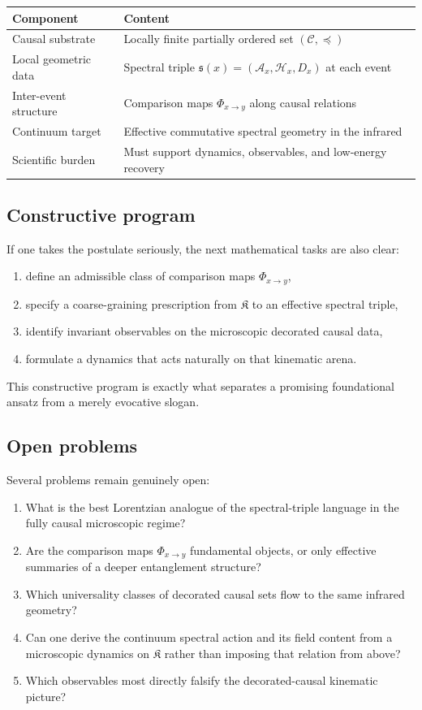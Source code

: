 \documentclass[12pt,a4paper]{article}
\theoremstyle{postulate}
\newcommand{\Hil}{\mathcal{H}}
\newcommand{\Alg}{\mathcal{A}}
\newcommand{\Dirac}{D}
\newcommand{\Causal}{\mathcal{C}}
\newcommand{\Kset}{\mathfrak{K}}
\begin{document}
\begin{center}
\renewcommand{\arraystretch}{1.2}
\begin{tabular}{@{}p{3.0cm}p{10.0cm}@{}}
\toprule
\textbf{Component} & \textbf{Content} \\
\midrule
Causal substrate & Locally finite partially ordered set $(\Causal,\preceq)$ \\
Local geometric data & Spectral triple $\mathfrak{s}(x)=(\Alg_x,\Hil_x,\Dirac_x)$ at each event \\
Inter-event structure & Comparison maps $\Phi_{x\to y}$ along causal relations \\
Continuum target & Effective commutative spectral geometry in the infrared \\
Scientific burden & Must support dynamics, observables, and low-energy recovery \\
\bottomrule
\end{tabular}
\end{center}

\subsection{Constructive program}

If one takes the postulate seriously, the next mathematical tasks are also
clear:
\begin{enumerate}[label=\arabic*.]
  \item define an admissible class of comparison maps $\Phi_{x\to y}$,
  \item specify a coarse-graining prescription from $\Kset$ to an effective
  spectral triple,
  \item identify invariant observables on the microscopic decorated causal
  data,
  \item formulate a dynamics that acts naturally on that kinematic arena.
\end{enumerate}
This constructive program is exactly what separates a promising foundational
ansatz from a merely evocative slogan.

\subsection{Open problems}

Several problems remain genuinely open:
\begin{enumerate}[label=\arabic*.]
  \item What is the best Lorentzian analogue of the spectral-triple language
  in the fully causal microscopic regime?
  \item Are the comparison maps $\Phi_{x\to y}$ fundamental objects, or only
  effective summaries of a deeper entanglement structure?
  \item Which universality classes of decorated causal sets flow to the same
  infrared geometry?
  \item Can one derive the continuum spectral action and its field content
  from a microscopic dynamics on $\Kset$ rather than imposing that relation
  from above?
  \item Which observables most directly falsify the decorated-causal
  kinematic picture?
\end{enumerate}
\end{document}
